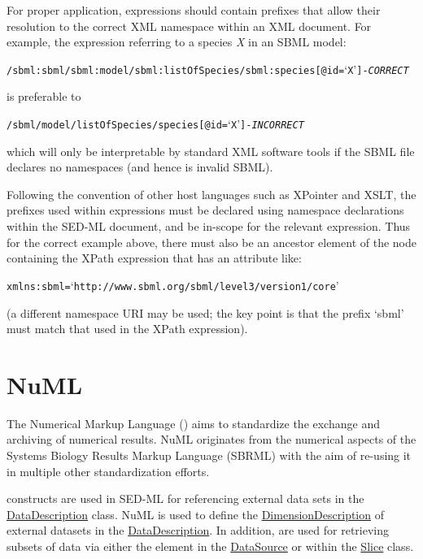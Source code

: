 For proper application,  expressions should contain prefixes that allow their resolution to the correct XML namespace within an XML document. For example, the  expression referring to a species \emph{X} in an SBML model:
\begin{alltt}
/sbml:sbml/sbml:model/sbml:listOfSpecies/sbml:species[@id=`X'] {\tickYes -\emph{CORRECT}}
\end{alltt}
is preferable to 
\begin{alltt}
/sbml/model/listOfSpecies/species[@id=`X'] {\tickNo -\emph{INCORRECT} }
\end{alltt}

which will only be interpretable by standard XML software tools if the SBML file declares no namespaces (and hence is invalid SBML).

Following the convention of other  host languages such as XPointer and XSLT, the prefixes used within  expressions must be declared using namespace declarations within the SED-ML document, and be in-scope for the relevant expression. Thus for the correct example above, there must also be an ancestor element of the node containing the XPath expression that has an attribute like:
\begin{alltt}
xmlns:sbml=`http://www.sbml.org/sbml/level3/version1/core'
\end{alltt}
(a different namespace URI may be used; the key point is that the prefix `sbml' must match that used in the XPath expression).


\section{NuML}
\label{sec:numl}
The Numerical Markup Language () aims to standardize the exchange and archiving of numerical results. NuML originates from the numerical aspects of the Systems Biology Results Markup Language (SBRML) with the aim of re-using it in multiple other standardization efforts.

 constructs are used in SED-ML for referencing external data sets in the \hyperref[class:dataDescription]{DataDescription} class. NuML is used to define the \hyperref[sec:dimensionDescription]{DimensionDescription} of external datasets in the \hyperref[class:dataDescription]{DataDescription}. In addition, \hyperref[type:numlsid]{} are used for retrieving subsets of data via either the \hyperref[sec:indexSet]{} element in the \hyperref[class:dataSource]{DataSource} or within the \hyperref[class:slice]{Slice} class.

